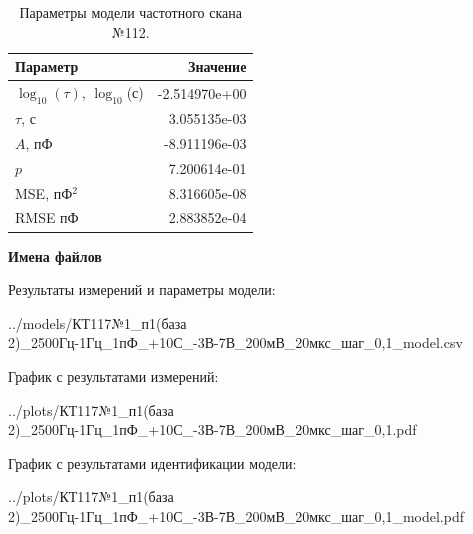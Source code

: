 \begin{table}[!ht]
    \centering
    \caption{Параметры модели частотного скана №112.}
    \begin{tabular}{|l|r|}
        \hline
        Параметр                                       & Значение                  \\ \hline
        $\log_{10}(\tau)$, $\log_{10}$(с)              & -2.514970e+00             \\ \hline
        $\tau$, с                                      & 3.055135e-03              \\ \hline
        $A$, пФ                                        & -8.911196e-03             \\ \hline
        $p$                                            & 7.200614e-01              \\ \hline
        MSE, пФ$^2$                                    & 8.316605e-08              \\ \hline
        RMSE пФ                                        & 2.883852e-04              \\ \hline
    \end{tabular}
    \label{table:frequency_scan_model_112}
\end{table}

\textbf{Имена файлов}

Результаты измерений и параметры модели:

\scriptsize../models/КТ117№1\_п1(база 2)\_2500Гц-1Гц\_1пФ\_+10С\_-3В-7В\_200мВ\_20мкс\_шаг\_0,1\_model.csv
\normalsize

График с результатами измерений:

\scriptsize../plots/КТ117№1\_п1(база 2)\_2500Гц-1Гц\_1пФ\_+10С\_-3В-7В\_200мВ\_20мкс\_шаг\_0,1.pdf
\normalsize

График с результатами идентификации модели:

\scriptsize../plots/КТ117№1\_п1(база 2)\_2500Гц-1Гц\_1пФ\_+10С\_-3В-7В\_200мВ\_20мкс\_шаг\_0,1\_model.pdf
\normalsize

